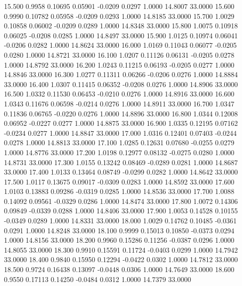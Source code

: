   15.500   0.9958   0.10695   0.05901  -0.0209   0.0297   1.0000  14.8007  33.0000
  15.600   0.9990   0.10782   0.05958  -0.0209   0.0293   1.0000  14.8185  33.0000
  15.700   1.0029   0.10858   0.06002  -0.0209   0.0289   1.0000  14.8348  33.0000
  15.800   1.0075   0.10918   0.06025  -0.0208   0.0285   1.0000  14.8497  33.0000
  15.900   1.0125   0.10974   0.06041  -0.0206   0.0282   1.0000  14.8624  33.0000
  16.000   1.0169   0.11043   0.06077  -0.0205   0.0280   1.0000  14.8721  33.0000
  16.100   1.0207   0.11126   0.06131  -0.0205   0.0278   1.0000  14.8792  33.0000
  16.200   1.0243   0.11215   0.06193  -0.0205   0.0277   1.0000  14.8846  33.0000
  16.300   1.0277   0.11311   0.06266  -0.0206   0.0276   1.0000  14.8884  33.0000
  16.400   1.0307   0.11415   0.06352  -0.0208   0.0276   1.0000  14.8906  33.0000
  16.500   1.0332   0.11530   0.06453  -0.0210   0.0276   1.0000  14.8916  33.0000
  16.600   1.0343   0.11676   0.06598  -0.0214   0.0276   1.0000  14.8911  33.0000
  16.700   1.0347   0.11836   0.06765  -0.0220   0.0276   1.0000  14.8896  33.0000
  16.800   1.0344   0.12008   0.06952  -0.0227   0.0277   1.0000  14.8875  33.0000
  16.900   1.0335   0.12195   0.07162  -0.0234   0.0277   1.0000  14.8847  33.0000
  17.000   1.0316   0.12401   0.07403  -0.0244   0.0278   1.0000  14.8813  33.0000
  17.100   1.0285   0.12631   0.07680  -0.0255   0.0279   1.0000  14.8776  33.0000
  17.200   1.0198   0.12977   0.08132  -0.0275   0.0280   1.0000  14.8731  33.0000
  17.300   1.0155   0.13242   0.08469  -0.0289   0.0281   1.0000  14.8687  33.0000
  17.400   1.0133   0.13464   0.08749  -0.0299   0.0282   1.0000  14.8642  33.0000
  17.500   1.0117   0.13675   0.09017  -0.0309   0.0283   1.0000  14.8592  33.0000
  17.600   1.0103   0.13883   0.09286  -0.0319   0.0285   1.0000  14.8536  33.0000
  17.700   1.0088   0.14092   0.09561  -0.0329   0.0286   1.0000  14.8474  33.0000
  17.800   1.0072   0.14306   0.09849  -0.0339   0.0288   1.0000  14.8406  33.0000
  17.900   1.0053   0.14528   0.10155  -0.0349   0.0289   1.0000  14.8331  33.0000
  18.000   1.0029   0.14762   0.10485  -0.0361   0.0291   1.0000  14.8248  33.0000
  18.100   0.9999   0.15013   0.10850  -0.0373   0.0294   1.0000  14.8156  33.0000
  18.200   0.9960   0.15286   0.11256  -0.0387   0.0296   1.0000  14.8055  33.0000
  18.300   0.9910   0.15591   0.11724  -0.0403   0.0299   1.0000  14.7942  33.0000
  18.400   0.9840   0.15950   0.12294  -0.0422   0.0302   1.0000  14.7812  33.0000
  18.500   0.9724   0.16438   0.13097  -0.0448   0.0306   1.0000  14.7649  33.0000
  18.600   0.9550   0.17113   0.14250  -0.0484   0.0312   1.0000  14.7379  33.0000
